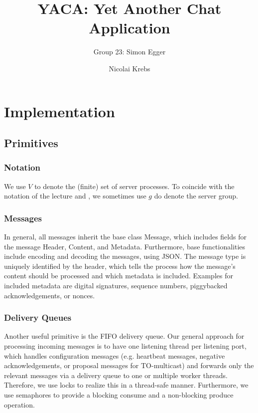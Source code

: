 \documentclass[runningheads]{llncs}
\begin{document}
%
\title{YACA: Yet Another Chat Application}

\author{Group 23: Simon Egger \and Nicolai Krebs}

\institute{}
%
\maketitle              %


\section{Implementation}

\subsection{Primitives}

\subsubsection{Notation} We use $V$ to denote the (finite) set of server processes. To coincide with the notation of the lecture and \cite{ds_book}, we sometimes use $g$ do denote the server group.

\subsubsection{Messages}
In general, all messages inherit the base class \textsf{Message}, which includes fields for the message \textsf{Header}, \textsf{Content}, and \textsf{Metadata}. Furthermore, base functionalities include encoding and decoding the messages, using JSON. The message type is uniquely identified by the header, which tells the process how the message's content should be processed and which metadata is included. Examples for included metadata are digital signatures, sequence numbers, piggybacked acknowledgements, or nonces.

\subsubsection{Delivery Queues}
Another useful primitive is the FIFO delivery queue. Our general approach for processing incoming messages is to have one listening thread per listening port, which handles configuration messages (e.g. heartbeat messages, negative acknowledgements, or proposal messages for TO-multicast) and forwards only the relevant messages via a delivery queue to one or multiple worker threads. Therefore, we use locks to realize this in a thread-safe manner. Furthermore, we use semaphores to provide a blocking consume and a non-blocking produce operation. 
\end{document}
